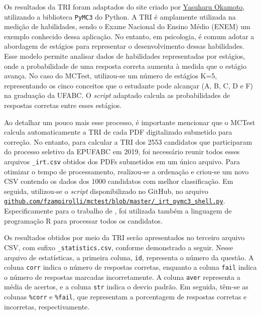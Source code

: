 Os resultados da TRI foram adaptados do site criado por \href{http://y-okamoto-psy1949.la.coocan.jp/Python/en1/IRTLClassPyMC3/}{Yasuharu Okamoto}, utilizando a biblioteca \verb|PyMC3| do Python. A TRI é amplamente utilizada na medição de habilidades, sendo o Exame Nacional do Ensino Médio (ENEM) um exemplo conhecido dessa aplicação. No entanto, em psicologia, é comum adotar a abordagem de estágios para representar o desenvolvimento dessas habilidades. Esse modelo permite analisar dados de habilidades representadas por estágios, onde a probabilidade de uma resposta correta aumenta à medida que o estágio avança. No caso do MCTest, utilizou-se um número de estágios K=5, representando os cinco conceitos que o estudante pode alcançar (A, B, C, D e F) na graduação da UFABC. O \textit{script} adaptado calcula as probabilidades de respostas corretas entre esses estágios.

Ao detalhar um pouco mais esse processo, é importante mencionar que o MCTest calcula automaticamente a TRI de cada PDF digitalizado submetido para correção. No entanto, para calcular a TRI dos 2553 candidatos que participaram do processo seletivo da EPUFABC em 2019, foi necessário reunir todos esses arquivos \verb|_irt.csv| obtidos dos PDFs submetidos em um único arquivo. Para otimizar o tempo de processamento, realizou-se a ordenação e criou-se um novo CSV contendo os dados dos 1000 candidatos com melhor classificação. Em seguida, utilizou-se o \textit{script} disponibilizado no GitHub, no arquivo \href{https://github.com/fzampirolli/mctest/blob/master/_irt_pymc3_shell.py}{\texttt{github.com/fzampirolli/mctest/blob/master/\_irt\_pymc3\_shell.py}}. Especificamente para o trabalho de , foi utilizada também a linguagem de programação R para processar todos os candidatos.




Os resultados obtidos por meio da TRI serão apresentados no terceiro arquivo CSV, com sufixo \verb|_statistics.csv|, conforme demonstrado a seguir. Nesse arquivo de estatísticas, a primeira coluna, \verb|id|, representa o número da questão. A coluna \verb|corr| indica o número de respostas corretas, enquanto a coluna \verb|fail| indica o número de respostas marcadas incorretamente. A coluna \verb|aver| representa a média de acertos, e a coluna \verb|str| indica o desvio padrão. Em seguida, têm-se as colunas \verb|%corr| e \verb|%fail|, que representam a porcentagem de respostas corretas e incorretas, respectivamente.

